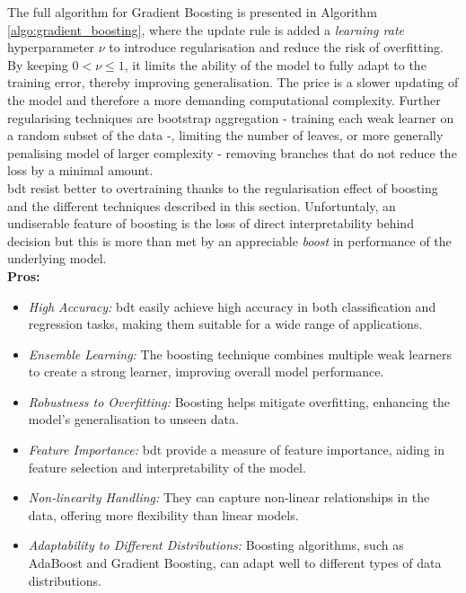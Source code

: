 The full algorithm for Gradient Boosting is presented in Algorithm \ref{algo:gradient_boosting}, where the update rule is added a \textit{learning rate} hyperparameter $\nu$ to introduce regularisation and reduce the risk of overfitting. By keeping $0 < \nu \leq 1$, it limits the ability of the model to fully adapt to the training error, thereby improving generalisation. The price is a slower updating of the model and therefore a more demanding computational complexity. Further regularising techniques are bootstrap aggregation - training each weak learner on a random subset of the data -, limiting the number of leaves, or more generally penalising model of larger complexity - removing branches that do not reduce the loss by a minimal amount. \\

\gls{bdt} resist better to overtraining thanks to the regularisation effect of boosting and the different techniques described in this section. Unfortuntaly, an undiserable feature of boosting is the loss of direct interpretability behind decision but this is more than met by an appreciable \textit{boost} in performance of the underlying model.\\

\textbf{Pros:}
\begin{itemize}
    \item \textit{High Accuracy:} \gls{bdt} easily achieve high accuracy in both classification and regression tasks, making them suitable for a wide range of applications.
    \item \textit{Ensemble Learning:} The boosting technique combines multiple weak learners to create a strong learner, improving overall model performance.
    \item \textit{Robustness to Overfitting:} Boosting helps mitigate overfitting, enhancing the model's generalisation to unseen data.
    \item \textit{Feature Importance:} \gls{bdt} provide a measure of feature importance, aiding in feature selection and interpretability of the model.
    \item \textit{Non-linearity Handling:} They can capture non-linear relationships in the data, offering more flexibility than linear models.
    \item \textit{Adaptability to Different Distributions:} Boosting algorithms, such as AdaBoost and Gradient Boosting, can adapt well to different types of data distributions.
\end{itemize}


